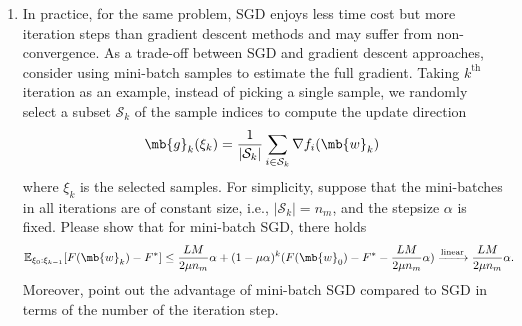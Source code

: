 \begin{exercise}
\begin{enumerate}
        \item In practice, for the same problem, SGD enjoys less time cost but more iteration steps than gradient descent methods and may suffer from non-convergence. As a trade-off between SGD and gradient descent approaches, consider using mini-batch samples to estimate the full gradient. Taking $k^\text{th}$ iteration as an example, instead of picking a single sample, we randomly select a subset $\mathcal{S}_k$ of the sample indices to compute the update direction
            \begin{align*}
                \mb{g}_k(\xi_k)=\frac{1}{|\mathcal{S}_k|}\sum_{i\in\mathcal{S}_k} \nabla f_{i}(\mb{w}_k)
            \end{align*}
            where $\xi_k$ is the selected samples. For simplicity, suppose that the mini-batches in all iterations are of constant size, i.e., $|\mathcal{S}_k|=n_m$, and the stepsize $\alpha$ is fixed. Please show that for mini-batch SGD, there holds
            \begin{align*}
                \mathbb{E}_{\xi_0:\xi_{k-1}}[F(\mb{w}_{k})-F^*] & \leq\frac{LM}{2\mu n_m}\alpha+(1-\mu\alpha)^{k}(F(\mb{w}_0)-F^*-\frac{LM}{2\mu n_m}\alpha)
                \xrightarrow[]{\textup{linear}}\frac{LM}{2\mu n_m}\alpha.
            \end{align*}
            Moreover, point out the advantage of mini-batch SGD compared to SGD
            in terms of the number of the iteration step.


\end{enumerate}
\end{exercise}
